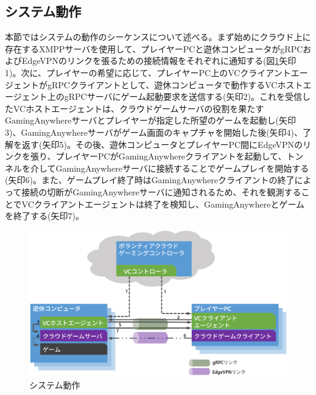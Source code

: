 \subsection{システム動作}
本節ではシステムの動作のシーケンスについて述べる。まず始めにクラウド上に存在するXMPPサーバを使用して、プレイヤーPCと遊休コンピュータがgRPCおよびEdgeVPNのリンクを張るための接続情報をそれぞれに通知する(図\ref{fig:seq}矢印1)。次に、プレイヤーの希望に応じて、プレイヤーPC上のVCクライアントエージェントがgRPCクライアントとして、遊休コンピュータで動作するVCホストエージェント上のgRPCサーバにゲーム起動要求を送信する(矢印2)。これを受信したVCホストエージェントは、クラウドゲームサーバの役割を果たすGamingAnywhereサーバとプレイヤーが指定した所望のゲームを起動し(矢印3)、GamingAnywhereサーバがゲーム画面のキャプチャを開始した後(矢印4)、了解を返す(矢印5)。その後、遊休コンピュータとプレイヤーPC間にEdgeVPNのリンクを張り、プレイヤーPCがGamingAnywhereクライアントを起動して、トンネルを介してGamingAnywhereサーバに接続することでゲームプレイを開始する(矢印6)。また、ゲームプレイ終了時はGamingAnywhereクライアントの終了によって接続の切断がGamingAnywhereサーバに通知されるため、それを観測することでVCクライアントエージェントは終了を検知し、GamingAnywhereとゲームを終了する(矢印7)。

\begin{figure}[t]
    \centering
    \includegraphics[width=\textwidth,keepaspectratio,clip]{img/sequence.eps}
    \caption{システム動作}
    \label{fig:seq}
\end{figure}


